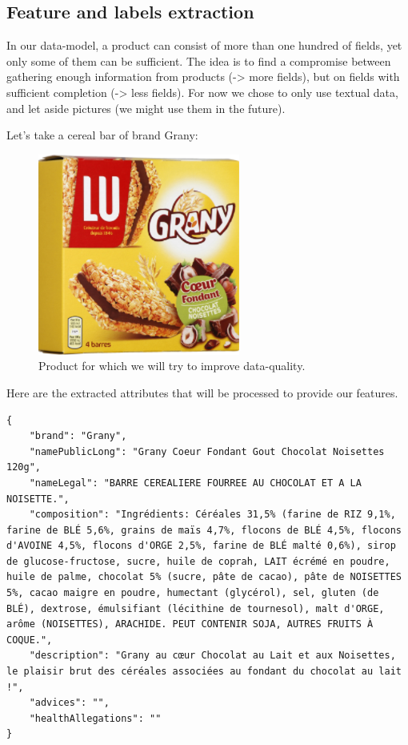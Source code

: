 

\subsection{Feature and labels extraction}

In our data-model, a product can consist of more than one hundred of fields, yet only some of them can be sufficient.
The idea is to find a compromise between gathering enough information from products (-> more fields), but on fields with sufficient completion (-> less fields). For now we chose to only use textual data, and let aside pictures (we might use them in the future).

Let's take a cereal bar of brand Grany:
\begin{figure}[H]
\centering
\includegraphics[scale=0.50]{./images/sample/grany_picture.png}
\caption{Product for which we will try to improve data-quality.}
\end{figure}

Here are the extracted attributes that will be processed to provide our features.

\begin{verbatim}
{
    "brand": "Grany",
    "namePublicLong": "Grany Coeur Fondant Gout Chocolat Noisettes 120g",
    "nameLegal": "BARRE CEREALIERE FOURREE AU CHOCOLAT ET A LA NOISETTE.",
    "composition": "Ingrédients: Céréales 31,5% (farine de RIZ 9,1%, farine de BLÉ 5,6%, grains de maïs 4,7%, flocons de BLÉ 4,5%, flocons d'AVOINE 4,5%, flocons d'ORGE 2,5%, farine de BLÉ malté 0,6%), sirop de glucose-fructose, sucre, huile de coprah, LAIT écrémé en poudre, huile de palme, chocolat 5% (sucre, pâte de cacao), pâte de NOISETTES 5%, cacao maigre en poudre, humectant (glycérol), sel, gluten (de BLÉ), dextrose, émulsifiant (lécithine de tournesol), malt d'ORGE, arôme (NOISETTES), ARACHIDE. PEUT CONTENIR SOJA, AUTRES FRUITS À COQUE.",
    "description": "Grany au cœur Chocolat au Lait et aux Noisettes, le plaisir brut des céréales associées au fondant du chocolat au lait !",
    "advices": "",
    "healthAllegations": ""
}
\end{verbatim}

